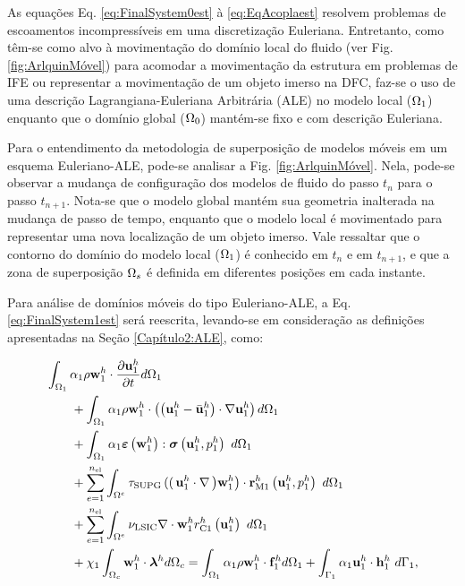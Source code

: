 \documentclass[tese_patricia]{subfiles}
\begin{document}
As equações Eq. \ref{eq:FinalSystem0est} à \ref{eq:EqAcoplaest} resolvem problemas de escoamentos incompressíveis em uma discretização Euleriana. Entretanto, como têm-se como alvo à movimentação do domínio local do fluido (ver Fig. \ref{fig:ArlquinMóvel}) para acomodar a movimentação da estrutura em problemas de IFE ou representar a movimentação de um objeto imerso na DFC, faz-se o uso de uma descrição Lagrangiana-Euleriana Arbitrária (ALE) no modelo local ($\Omega_1$) enquanto que o domínio global ($\Omega_0$) mantém-se fixo e com descrição Euleriana. 

Para o entendimento da metodologia de superposição de modelos móveis em um esquema Euleriano-ALE, pode-se analisar a Fig. \ref{fig:ArlquinMóvel}. Nela, pode-se observar a mudança de configuração dos modelos de fluido do passo $t_n$ para o passo $t_{n+1}$. Nota-se que o modelo global mantém sua geometria inalterada na mudança de passo de tempo, enquanto que o modelo local é movimentado para representar uma nova localização de um objeto imerso. Vale ressaltar que o contorno do domínio do modelo local ($\Omega_1$) é conhecido em $t_n$ e em $t_{n+1}$, e que a zona de superposição $\Omega_s$ é definida em diferentes posições em cada instante.


Para análise de domínios móveis do tipo Euleriano-ALE, a Eq. \ref{eq:FinalSystem1est} será reescrita, levando-se em consideração as definições apresentadas na Seção \ref{Capítulo2:ALE}, como:


\begin{align}
	\begin{split}
		&\int_{\domain_1} \arlequinWFLocal \density \wlocalh \cdot \frac{\partial\ulocalh}{\partial t} d\domain_{1} \\ 
		&\qquad+
		\int_{\domain_1} \arlequinWFLocal \density \wlocalh \cdot  \left(\left(\ulocalh - \velocityALEh_{1}\right) \cdot \nabla\ulocalh\right) d\domain_{1}  \\ 
		&\qquad+	
		\int_{\domain_{1}} \arlequinWFLocal \straintensor \left(\wlocalh\right) : \stresstensor \left(\ulocalh,\plocalh\right)\ d\domain_{1} 
		\\ 
		&\qquad+ \sum_{e=1}^{\nel} \int_{\domainE} \SUPG  \left( \right(\ulocalh \cdot \nabla \left) \wlocalh\right) \cdot \resMomLocal\left(\ulocalh,\plocalh \right)\  d\domain_{1} \\ 
		&\qquad+\sum_{e=1}^{\nel} \int_{\domainE} \LSIC \nabla \cdot \wlocalh \resPreLocal
		\left(\ulocalh\right)\  d\domain_{1} \\
		&\qquad+  \chi_{1} \int_{\domain_c} \wlocalh \cdot \lagrangeMultiplier^{h} d\domain_{c}  = \int_{\domain_1} \arlequinWFLocal \density \wlocalh \cdot  \sbodyforce_{1}^{h} d\domain_{1} + \int_{\boundary_{1}} \arlequinWFLocal \ulocalh \cdot \straction_{1}^{h}\ d\boundary_{1},
		\label{eq:QtdeMovArlqALE}
	\end{split}
\end{align}
\end{document}
